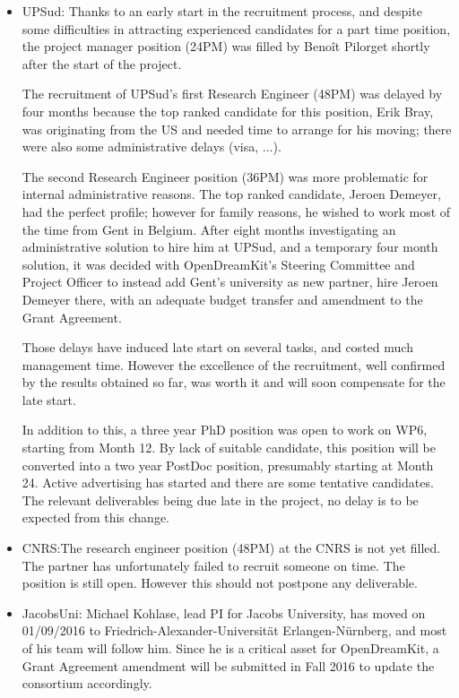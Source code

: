 \documentclass{deliverablereport}
\begin{document}
\begin{itemize}
\item{UPSud:}
  Thanks to an early start in the recruitment process, and despite
  some difficulties in attracting experienced candidates for a part
  time position, the project manager position (24PM) was filled by
  Benoît Pilorget shortly after the start of the project.

  The recruitment of UPSud's first Research Engineer (48PM) was
  delayed by four months because the top ranked candidate for this
  position, Erik Bray, was originating from the US and needed time to
  arrange for his moving; there were also some administrative delays
  (visa, ...).

  The second Research Engineer position (36PM) was more problematic
  for internal administrative reasons. The top ranked candidate,
  Jeroen Demeyer, had the perfect profile; however for family reasons,
  he wished to work most of the time from Gent in Belgium. After eight
  months investigating an administrative solution to hire him at
  UPSud, and a temporary four month solution, it was decided with
  OpenDreamKit's Steering Committee and Project Officer to instead add
  Gent's university as new partner, hire Jeroen Demeyer there, with an
  adequate budget transfer and amendment to the Grant Agreement.

  Those delays have induced late start on several tasks, and costed
  much management time. However the excellence of the recruitment, well
  confirmed by the results obtained so far, was worth it and will soon
  compensate for the late start.

  In addition to this, a three year PhD position was open to work on WP6, starting from
  Month 12. By lack of suitable candidate, this position will be
  converted into a two year PostDoc position, presumably starting at
  Month 24. Active advertising has started and there are some
  tentative candidates. The relevant deliverables being due late in
  the project, no delay is to be expected from this change.\\

\item{CNRS:}The research engineer position (48PM) at the CNRS is not yet filled. The partner has unfortunately failed to recruit someone on time. The position is still open. However this should not postpone any deliverable.\\

\item{JacobsUni:} Michael Kohlase, lead PI for Jacobs University, has
  moved on 01/09/2016 to Friedrich-Alexander-Universität
  Erlangen-Nürnberg, and most of his team will follow him. Since he is
  a critical asset for OpenDreamKit, a Grant Agreement amendment will
  be submitted in Fall 2016 to update the consortium accordingly.\\


\end{itemize}
\end{document}

